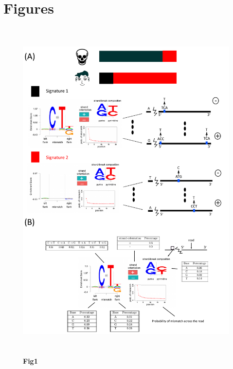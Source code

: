 \documentclass[10pt,letterpaper]{article}
\begin{document}
\section*{Figures}
\newpage

\begin{figure}[h!]
\centering
\includegraphics[height=7in, width=5in]{Figure1.pdf}
\caption{\textbf{Fig1}}
\label{fig:fig1}
\end{figure}
\end{document}
